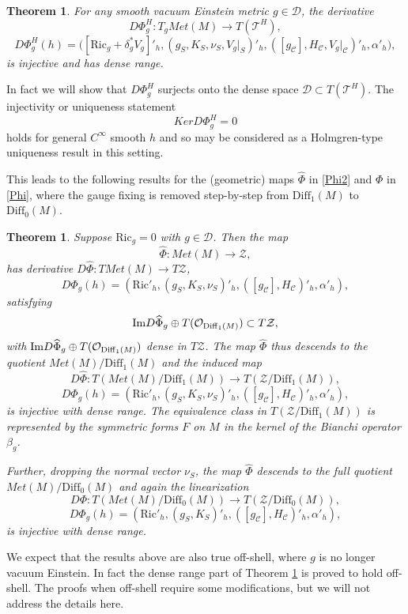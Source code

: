 \documentclass[10pt]{amsart}
\renewcommand{\a}{\alpha}
\renewcommand{\b}{\beta}
\renewcommand{\d}{\delta}
\newcommand{\cO}{{\mathcal O}}
\newcommand{\cC}{{\mathcal C}}
\newcommand{\cT}{{\mathcal T}}
\newcommand{\cD}{{\mathcal D}}
\newcommand{\cZ}{\mathcal Z}
\newcommand{\Ric}{\mathrm{Ric}}
\newcommand{\Diff}{\mathrm{Diff}}
\newcommand{\be}{\begin{equation}}
\newcommand{\ee}{\end{equation}}
\renewcommand{\to}{\rightarrow}
\renewcommand{\hat}{\widehat}
\newcommand{\<}{\langle}
\renewcommand{\>}{\rangle}
\theoremstyle{plain}
\newtheorem{theorem}[lemma]{Theorem}
\theoremstyle{remark}
\theoremstyle{definition}
\numberwithin{equation}{section}
\begin{document}
\begin{theorem}\label{ThmI}
For any smooth vacuum Einstein metric $g \in \cD$, the derivative 
$$D\Phi_g^H: T_g Met(M) \to T(\cT^H),$$
$$D\Phi_g^H(h) =  \big([\Ric_g + \d_g^* V_g]'_h, (g_S, K_S, \nu_S, V_g|_{S})'_h, ([g_{\cC}], H_{\cC}, V_g|_{\cC})'_h, \a'_h),$$
is injective and has dense range. 

\end{theorem} 

  In fact we will show that $D\Phi_g^H$ surjects onto the dense space $\cD \subset T(\cT^H)$. The injectivity or uniqueness statement 
$$Ker D\Phi_g^H = 0$$
holds for general $C^{\infty}$ smooth $h$ and so may be considered as a Holmgren-type uniqueness result in this setting. 

  This leads to the following results for the (geometric) maps $\hat \Phi$ in \eqref{Phi2} and $\Phi$ in \eqref{Phi}, where the gauge 
fixing is removed step-by-step from $\Diff_1(M)$ to $\Diff_0(M)$. 

\begin{theorem}\label{ThmII} 
Suppose $\Ric_g = 0$ with $g \in \cD$. Then the map 
$$\hat \Phi: Met(M) \to \cZ,$$
has derivative $D\hat \Phi: TMet(M) \to T\cZ$, 
$$D\hat \Phi_g(h) = (\Ric'_h, (g_S, K_S, \nu_S)'_h, ([g_{\cC}], H_{\cC})'_h, \a'_h),$$
satisfying 
\be \label{transv}
{\rm Im}D \hat \Phi_g \oplus T(\cO_{\Diff_1 (M)}) \subset T \cZ,
\ee
with ${\rm Im}D \hat \Phi_g \oplus T(\cO_{\Diff_1 (M)})$ dense in $T \cZ$. 
The map $\hat \Phi$ thus descends to the quotient $Met(M)/\Diff_1(M)$ and the induced map 
$$D\hat \Phi: T(Met(M)/\Diff_1(M)) \to T(\cZ/\Diff_1(M)),$$
$$D \hat \Phi_g(h) = (\Ric'_h, (g_S, K_S, \nu_S)'_h, ([g_{\cC}], H_{\cC})'_h, \a'_h),$$
is injective with dense range. The equivalence class in $T(\cZ/\Diff_1(M))$ is represented by the symmetric forms $F$ on $M$ in the kernel 
of the Bianchi operator $\b_g$. 


Further, dropping the normal vector $\nu_S$, the map $\hat \Phi$ descends to the full quotient $Met(M)/\Diff_0(M)$ and again the linearization 
$$D\Phi: T(Met(M)/\Diff_0(M)) \to T(\cZ/\Diff_0(M)),$$
$$D \Phi_g(h) = (\Ric'_h, (g_S, K_S)'_h, ([g_{\cC}], H_{\cC})'_h, \a'_h),$$
is injective with dense range. 
\end{theorem} 

  We expect that the results above are also true off-shell, where $g$ is no longer vacuum Einstein. In fact the dense range part of 
Theorem \ref{ThmI} is proved to hold off-shell. The proofs when off-shell require some modifications, but we will not address the details here. 
\end{document}
